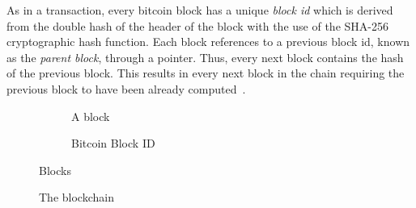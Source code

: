 As in a transaction, every bitcoin block has a unique \textit{block id} which is derived from the double hash of the header of the block with the use of the SHA-256 cryptographic hash function. Each block references to a previous block id, known as the \textit{parent block}, through a pointer. Thus, every next block contains the hash of the previous block. This results in every next block in the chain requiring the previous block to have been already computed~\cite{zindros_thesis}.

\begin{figure}[ht!]
  \begin{subfigure}[t]{0.40\textwidth}
    \centering
    \caption{A block}
    \label{fig:block:a}
  \end{subfigure}
  \begin{subfigure}[t]{0.40\textwidth}
    \centering
    \caption{Bitcoin Block ID}
    \label{fig:block:b}
  \end{subfigure}
  \caption{Blocks}
  \label{fig:blocks}
\end{figure}

\begin{figure}[ht!]
  \centering
  \caption{The blockchain}
  \label{fig:blockchain}
\end{figure}

